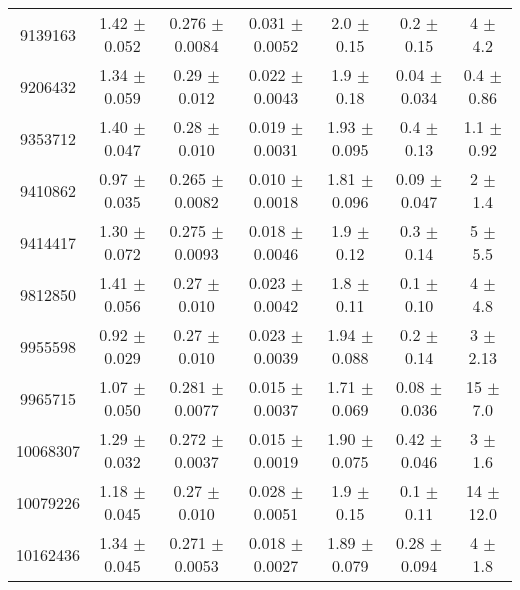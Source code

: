\begin{table*}
\begin{tabular}{c|cccccc}
9139163  &        1.42   $\pm$  0.052    &        0.276  $\pm$  0.0084   &        0.031  $\pm$  0.0052   &        2.0    $\pm$  0.15     &        0.2    $\pm$  0.15     &        4      $\pm$  4.2      \\
9206432  &        1.34   $\pm$  0.059    &        0.29   $\pm$  0.012    &        0.022  $\pm$  0.0043   &        1.9    $\pm$  0.18     &        0.04   $\pm$  0.034    &        0.4    $\pm$  0.86     \\
9353712  &        1.40   $\pm$  0.047    &        0.28   $\pm$  0.010    &        0.019  $\pm$  0.0031   &        1.93   $\pm$  0.095    &        0.4    $\pm$  0.13     &        1.1    $\pm$  0.92     \\
9410862  &        0.97   $\pm$  0.035    &        0.265  $\pm$  0.0082   &        0.010  $\pm$  0.0018   &        1.81   $\pm$  0.096    &        0.09   $\pm$  0.047    &        2      $\pm$  1.4      \\
9414417  &        1.30   $\pm$  0.072    &        0.275  $\pm$  0.0093   &        0.018  $\pm$  0.0046   &        1.9    $\pm$  0.12     &        0.3    $\pm$  0.14     &        5      $\pm$  5.5      \\
9812850  &        1.41   $\pm$  0.056    &        0.27   $\pm$  0.010    &        0.023  $\pm$  0.0042   &        1.8    $\pm$  0.11     &        0.1    $\pm$  0.10     &        4      $\pm$  4.8      \\
9955598  &        0.92   $\pm$  0.029    &        0.27   $\pm$  0.010    &        0.023  $\pm$  0.0039   &        1.94   $\pm$  0.088    &        0.2    $\pm$  0.14     &        3      $\pm$  2.13     \\
9965715  &        1.07   $\pm$  0.050    &        0.281  $\pm$  0.0077   &        0.015  $\pm$  0.0037   &        1.71   $\pm$  0.069    &        0.08   $\pm$  0.036    &       15      $\pm$  7.0      \\
10068307 &        1.29   $\pm$  0.032    &        0.272  $\pm$  0.0037   &        0.015  $\pm$  0.0019   &        1.90   $\pm$  0.075    &        0.42   $\pm$  0.046    &        3      $\pm$  1.6      \\
10079226 &        1.18   $\pm$  0.045    &        0.27   $\pm$  0.010    &        0.028  $\pm$  0.0051   &        1.9    $\pm$  0.15     &        0.1    $\pm$  0.11     &        14     $\pm$  12.0     \\
10162436 &        1.34   $\pm$  0.045    &        0.271  $\pm$  0.0053   &        0.018  $\pm$  0.0027   &        1.89   $\pm$  0.079    &        0.28   $\pm$  0.094    &        4      $\pm$  1.8      \\

\end{tabular}
\end{table*}
